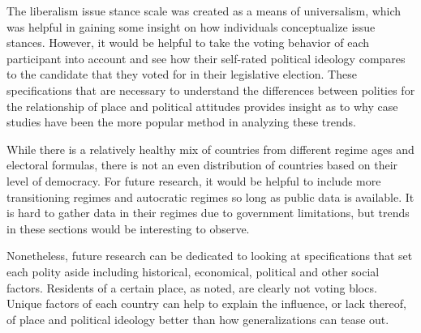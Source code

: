 \documentclass[12pt, titlepage]{article}
\begin{document}
The liberalism issue stance scale was created as a means of universalism, which was helpful in gaining some insight on how individuals conceptualize issue stances. However, it would be helpful to take the voting behavior of each participant into account and see how their self-rated political ideology compares to the candidate that they voted for in their legislative election. These specifications that are necessary to understand the differences between polities for the relationship of place and political attitudes provides insight as to why case studies have been the more popular method in analyzing these trends. 

While there is a relatively healthy mix of countries from different regime ages and electoral formulas, there is not an even distribution of countries based on their level of democracy. For future research, it would be helpful to include more transitioning regimes and autocratic regimes so long as public data is available. It is hard to gather data in their regimes due to government limitations, but trends in these sections would be interesting to observe.

Nonetheless, future research can be dedicated to looking at specifications that set each polity aside including historical, economical, political and other social factors. Residents of a certain place, as \cite{holloway_burning_2007} noted, are clearly not voting blocs. Unique factors of each country can help to explain the influence, or lack thereof, of place and political ideology better than how generalizations can tease out.       

\clearpage


\let\svaddcontentsline\addcontentsline
\renewcommand\addcontentsline[3]{%
	\ifthenelse{\equal{#1}{lof}}{}%
	{\ifthenelse{\equal{#1}{lot}}{}{\svaddcontentsline{#1}{#2}{#3}}}}


\appendixtitleon
\appendixtitletocon
\end{document}
